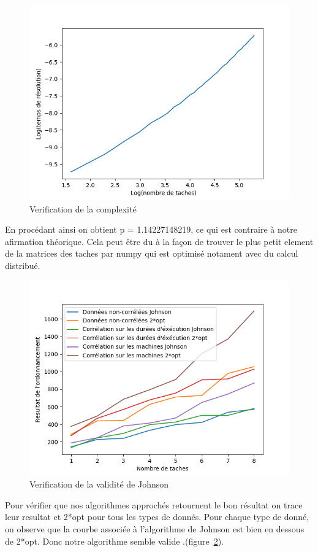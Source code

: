 \documentclass[a4paper, 10pt]{article}
\begin{document}
                \begin{figure}[H]
			\centering
			\includegraphics[width=0.8\linewidth]{graphes/verification_Johnson.png}
			\caption{Verification de la complexité}
			\label{fig:??}
		\end{figure}
                En procédant ainsi on obtient p = 1.14227148219, ce qui est contraire à notre afirmation théorique. Cela peut être du à la façon de trouver le plus petit element de la matrices des taches par numpy qui est optimisé  notament avec du calcul distribué.
                
		
		\begin{figure}[H]
			\centering
			\includegraphics[width=0.8\linewidth]{graphes/validite_Johnson.png}
			\caption{Verification de la validité de Johnson}
			\label{fig:validiteJ}
		\end{figure}
                
		
		Pour vérifier que nos algorithmes approchés retournent le bon résultat on trace leur resultat et 2*opt pour tous les types de donnés. Pour chaque type de donné, on observe que la courbe associée à l'algorithme de Johnson est bien en dessous de 2*opt. Donc notre algorithme semble valide .(figure~\ref{fig:validiteJ}).
		
\end{document}
